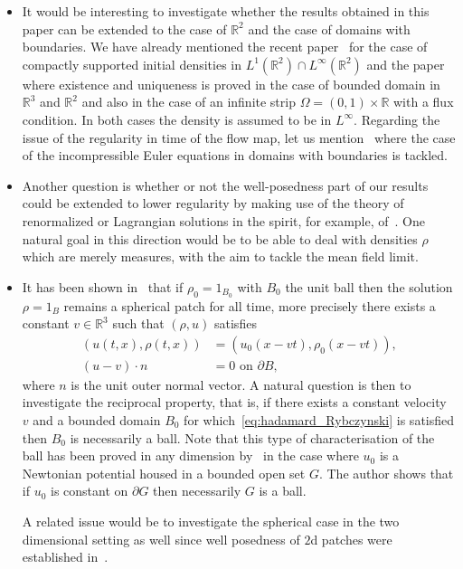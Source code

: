 \documentclass[10pt]{amsart}
\theoremstyle{definition}\newtheorem{defi}[theo]{Definition}\newtheorem{rema}[theo]{Remark}\newtheorem{exam}[theo]{Example}\newtheorem{exem}[theo]{Example}\newtheorem{nota}[theo]{Notation}
\newcommand{\R}{\mathbb{R}}
\begin{document}
\begin{itemize}
\item It would be interesting to investigate whether the results obtained in this paper can be extended to the case of $\R^2$ and the case of domains with boundaries. We have already mentioned the recent paper~\cite{GrayerII} for the case of compactly supported initial densities in $L^1(\R^2)\cap L^\infty(\R^2)$ and the paper~\cite{Leblond} where existence and uniqueness is proved in the case of bounded domain in $\R^3$ and $\R^2$ and also in the case of an infinite strip $\Omega= (0,1)\times \R$ with a flux condition. In both cases the density is assumed to be in $ L^{\infty}$. Regarding the issue of the regularity in time of the flow map, let us mention~\cite{ogfstt,GS,Kato,Sueur} where the case of the incompressible Euler equations in domains with boundaries is tackled.

\item Another question is whether or not the well-posedness part of our results could be extended to lower regularity by making use of the theory of renormalized or Lagrangian solutions in the spirit, for example, of~\cite{CCS,Lions}. One natural goal in this direction would be to be able to deal with densities $\rho$ which are merely measures, with the aim to tackle the mean field limit.
\item It has been shown in~\cite{Mecherbet2} that if $\rho_0=1_{B_0}$ with $B_0$ the unit ball then the solution $\rho=1_{B}$ remains a spherical patch for all time, more precisely there exists a constant $v\in \R^3$ such that $(\rho,u)$ satisfies
\begin{equation}\label{eq:hadamard_Rybczynski}
\begin{split}
(u(t,x),\rho(t,x))&=(u_0(x-vt),\rho_0(x-vt)),\\
(u-v)\cdot n& = 0 \text{ on } \partial B,
\end{split}
\end{equation}
where $n$ is the unit outer normal vector. A natural question is then to investigate the reciprocal property, that is, if there exists a constant velocity $v$ and a bounded domain $B_0$ for which~\eqref{eq:hadamard_Rybczynski} is satisfied then $B_0$ is necessarily a ball. Note that this type of characterisation of the ball has been proved in any dimension by~\cite[Theorem~1.1]{Fraenkel} in the case where $u_0$ is a Newtonian potential housed in a bounded open set $G$. The author shows that if $u_0$ is constant on $\partial G$ then necessarily $G$ is a ball.

A related issue would be to investigate the spherical case in the two dimensional setting as well since well posedness of $2$d patches were established in~\cite{GrayerII}.
\end{itemize}
\end{document}
